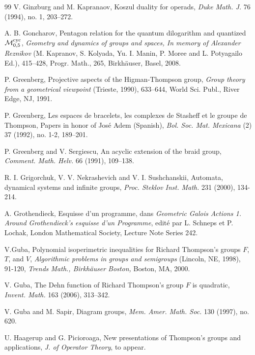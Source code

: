 \documentclass[twoside]{irmaems}
\theoremstyle{plain}
\theoremstyle{definition}
\theoremstyle{remark}
\begin{document}
\begin{small}
\begin{thebibliography}{99}
V. Ginzburg and M. Kapranaov, { Koszul duality for operads}, 
{\em   Duke Math. J.}  76  (1994),  no. 1, 203--272.





A. B. Goncharov, { Pentagon relation for the quantum dilogarithm and quantized 
${\cal M}\sb {0,5}\sp {\rm cyc}$},   
{\em  Geometry and dynamics of groups and spaces, 
In memory of Alexander Reznikov} (M. Kapranov, S. Kolyada, Yu. I. Manin, P. Moree and L. Potyagailo Ed.), 415--428, Progr. Math., 265, Birkh\"auser, 
Basel, 2008.



P. Greenberg, { 
Projective aspects of the Higman-Thompson group},  
{\em  Group theory from a geometrical viewpoint} (Trieste, 1990),  633--644, World Sci. Publ., River Edge, NJ, 1991.


P. Greenberg, { Les espaces de bracelets, les complexes
de Stasheff et le groupe de Thompson},
   Papers in honor of Jos\'e Adem (Spanish),  {\em  Bol.
Soc. Mat. Mexicana} (2) 37 (1992), no. 1-2, 189--201.


P. Greenberg and V. Sergiescu, { An acyclic extension of
the braid group},  {\em  Comment. Math. Helv.} {66} (1991), 109--138.


R. I. Grigorchuk, V. V. Nekrashevich and V. I. Sushchanskii, {
Automata, dynamical systems and infinite groups,} 
{\em  Proc. Steklov Inst. Math.}  231 (2000), 134-214. 





A. Grothendieck, {Esquisse d'un programme}, dans {\em Geometric Galois Actions 1. Around Grothendieck's esquisse d'un Programme}, edit\'e par L. Schneps et P. Lochak, London Mathematical Society, Lecture Note Series 242.

   
V.Guba, { Polynomial isoperimetric inequalities for 
Richard Thompson's groups $F$, $T$, and $V$}, 
{\em  Algorithmic problems in groups and semigroups} (Lincoln, NE, 1998),  
91-120, {\em Trends Math., Birkh\"auser Boston,} Boston, MA, 2000.

V. Guba, { The Dehn function of Richard Thompson's group $F$ is quadratic},   
{\em  Invent. Math. } 163 (2006),  313--342.

V. Guba and M. Sapir, { Diagram groups}, 
{\em  Mem. Amer. Math. Soc. } 130 (1997),  no. 620.
     

U. Haagerup and G. Picioroaga, New presentations of Thompson's groups and
applications, {\em J. of Operator Theory}, to appear.


\end{thebibliography}
\end{small}
\end{document}
